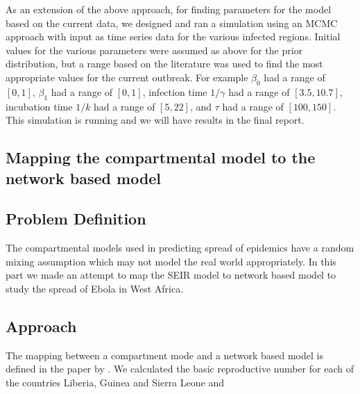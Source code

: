 \documentclass[10pt, journal,onecolumn]{IEEEtran}
\begin{document}
As an extension of the above approach, for finding parameters for the model based on the current data,
we designed and ran a simulation using an MCMC approach with input as time series data for the
various infected regions. Initial values for the various parameters were assumed as above for the
prior distribution, but a range based on the literature was used to find the most appropriate
values for the current outbreak. For example $\beta_0$  had a range of $[0,1]$,  $\beta_1$ had a range of
$[0,1]$, infection time $1/\gamma$ had a range of $[3.5,10.7]$, incubation time $1/k$ had a range of $[5,22]$,
and $\tau$ had a range of $[100,150]$. This simulation is running and we will
have results in the final report.




\subsection*{\textbf{Mapping the compartmental model to the network based model}}

\begin{figure}[ht]
\centering
{}
\end{figure}

\subsection*{\textbf{Problem Definition}}
The compartmental models used in predicting spread of epidemics have a random mixing assumption which may not model the real world appropriately. In this part we made an attempt  to map the SEIR model to network based model to study the spread of Ebola in West Africa.

\subsection*{\textbf{Approach}}

The mapping between a compartment mode and a network based model is defined in the paper by \cite{meyers2005network}. We calculated the basic reproductive number for each of the countries Liberia, Guinea and Sierra Leone and 
\end{document}
